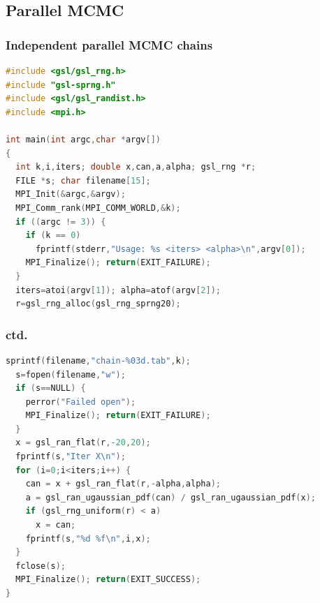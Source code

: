 \documentclass[mathserif,handout]{beamer}
\begin{document}
\subsection{Parallel MCMC}


\begin{frame}[fragile]
\frametitle{Independent parallel MCMC chains}
{\scriptsize
\begin{lstlisting}[language=C]
#include <gsl/gsl_rng.h>
#include "gsl-sprng.h"
#include <gsl/gsl_randist.h>
#include <mpi.h>

int main(int argc,char *argv[])
{
  int k,i,iters; double x,can,a,alpha; gsl_rng *r;
  FILE *s; char filename[15];
  MPI_Init(&argc,&argv);
  MPI_Comm_rank(MPI_COMM_WORLD,&k);
  if ((argc != 3)) {
    if (k == 0)
      fprintf(stderr,"Usage: %s <iters> <alpha>\n",argv[0]);
    MPI_Finalize(); return(EXIT_FAILURE);
  }
  iters=atoi(argv[1]); alpha=atof(argv[2]);
  r=gsl_rng_alloc(gsl_rng_sprng20);
\end{lstlisting}
}
\end{frame}

\begin{frame}[fragile]
\frametitle{ctd.}
{\scriptsize
\begin{lstlisting}[language=C]
  sprintf(filename,"chain-%03d.tab",k);
  s=fopen(filename,"w");
  if (s==NULL) {
    perror("Failed open");
    MPI_Finalize(); return(EXIT_FAILURE);
  }
  x = gsl_ran_flat(r,-20,20);
  fprintf(s,"Iter X\n");
  for (i=0;i<iters;i++) {
    can = x + gsl_ran_flat(r,-alpha,alpha);
    a = gsl_ran_ugaussian_pdf(can) / gsl_ran_ugaussian_pdf(x);
    if (gsl_rng_uniform(r) < a)
      x = can;
    fprintf(s,"%d %f\n",i,x);
  }
  fclose(s);
  MPI_Finalize(); return(EXIT_SUCCESS);
}
\end{lstlisting}
}
\end{frame}
\end{document}

